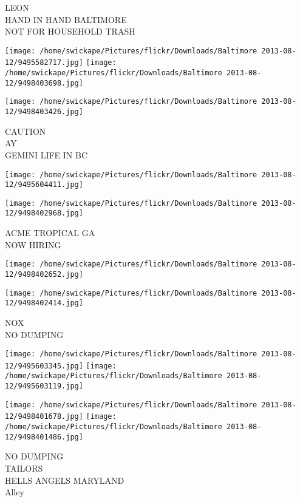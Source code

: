 \documentclass[10pt,letterpaper]{article}
\begin{document}
LEON\\
HAND IN HAND BALTIMORE\\
NOT FOR HOUSEHOLD TRASH\\
\pagebreak

\texttt{[image: /home/swickape/Pictures/flickr/Downloads/Baltimore 2013-08-12/9495582717.jpg]}
\texttt{[image: /home/swickape/Pictures/flickr/Downloads/Baltimore 2013-08-12/9498403698.jpg]}

\texttt{[image: /home/swickape/Pictures/flickr/Downloads/Baltimore 2013-08-12/9498403426.jpg]}

CAUTION\\
AY\\
GEMINI LIFE IN BC\\
\pagebreak

\texttt{[image: /home/swickape/Pictures/flickr/Downloads/Baltimore 2013-08-12/9495604411.jpg]}

\vspace{0.25in}
\texttt{[image: /home/swickape/Pictures/flickr/Downloads/Baltimore 2013-08-12/9498402968.jpg]}

ACME TROPICAL GA\\
NOW HIRING\\
\pagebreak

\texttt{[image: /home/swickape/Pictures/flickr/Downloads/Baltimore 2013-08-12/9498402652.jpg]}

\vspace{0.25in}
\texttt{[image: /home/swickape/Pictures/flickr/Downloads/Baltimore 2013-08-12/9498402414.jpg]}

NOX\\
NO DUMPING\\
\pagebreak

\texttt{[image: /home/swickape/Pictures/flickr/Downloads/Baltimore 2013-08-12/9495603345.jpg]}
\texttt{[image: /home/swickape/Pictures/flickr/Downloads/Baltimore 2013-08-12/9495603119.jpg]}

\texttt{[image: /home/swickape/Pictures/flickr/Downloads/Baltimore 2013-08-12/9498401678.jpg]}
\texttt{[image: /home/swickape/Pictures/flickr/Downloads/Baltimore 2013-08-12/9498401486.jpg]}

NO DUMPING\\
TAILORS\\
HELLS ANGELS MARYLAND\\
Alley\\
\pagebreak
\end{document}

